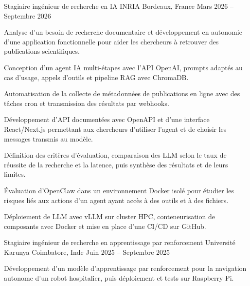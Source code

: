 
\begin{cventries}
  \cventry
    {Stagiaire ingénieur de recherche en IA}
    {INRIA}
    {Bordeaux, France}
    {Mars 2026 -- Septembre 2026}
    {
      \begin{cvitems}
        \item {Analyse d’un besoin de recherche documentaire et développement en autonomie d’une application fonctionnelle pour aider les chercheurs à retrouver des publications scientifiques.}
        \item {Conception d’un agent IA multi-étapes avec l’API OpenAI, prompts adaptés au cas d’usage, appels d’outils et pipeline RAG avec ChromaDB.}
        \item {Automatisation de la collecte de métadonnées de publications en ligne avec des tâches cron et transmission des résultats par webhooks.}
        \item {Développement d’API documentées avec OpenAPI et d’une interface React/Next.js permettant aux chercheurs d’utiliser l’agent et de choisir les messages transmis au modèle.}
        \item {Définition des critères d’évaluation, comparaison des LLM selon le taux de réussite de la recherche et la latence, puis synthèse des résultats et de leurs limites.}
        \item {Évaluation d’OpenClaw dans un environnement Docker isolé pour étudier les risques liés aux actions d’un agent ayant accès à des outils et à des fichiers.}
        \item {Déploiement de LLM avec vLLM sur cluster HPC, conteneurisation de composants avec Docker et mise en place d’une CI/CD sur GitHub.}
      \end{cvitems}
    }

  \cventry
    {Stagiaire ingénieur de recherche en apprentissage par renforcement}
    {Université Karunya}
    {Coimbatore, Inde}
    {Juin 2025 -- Septembre 2025}
    {
      \begin{cvitems}
        \item {Développement d’un modèle d’apprentissage par renforcement pour la navigation autonome d’un robot hospitalier, puis déploiement et tests sur Raspberry Pi.}
      \end{cvitems}
    }
\end{cventries}
